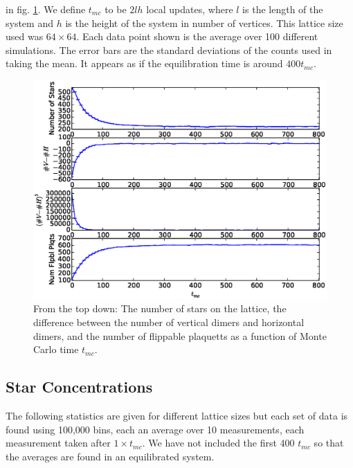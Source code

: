 \documentclass[aps,floatfix,11pt]{revtex4-1}
\begin{document}
\noindent
in fig. \ref{fig:nums_of_things}. We define $t_{mc}$ to be $2lh$ local updates, where $l$ is the length of the system and $h$ is the
height of the system in number of vertices. This lattice size used was $64\times 64$. Each data
point shown is the average over 100 different simulations. The error bars are the standard deviations of
the counts used in taking the mean. It appears as if the equilibration time is around $400t_{mc}$. 

\begin{figure}[h]
    \centering
    \includegraphics[width=8.5 cm]{num_order_params}
    \caption{From the top down: The number of stars on the lattice, the difference between the
    number of vertical dimers and horizontal dimers, and the number of flippable plaquetts as a
    function of Monte Carlo time $t_{mc}$. \label{fig:nums_of_things}}
\end{figure}

%

\subsection{Star Concentrations}

The following statistics are given for different lattice sizes but each set of data is found using
100,000 bins, each an average over 10 measurements, each measurement taken after $1\times t_{mc}$.
We have not included the first 400 $t_{mc}$ so that the averages are found in an equilibrated
system.
\end{document}

